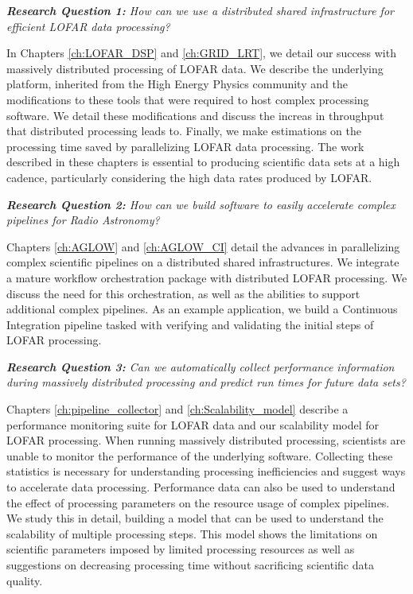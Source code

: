 \begin{addmargin}[4em]{8em}%
    \emph{\textbf{Research Question 1:} How can we use a distributed shared infrastructure for efficient LOFAR data processing?}
\end{addmargin}

In Chapters \ref{ch:LOFAR_DSP} and \ref{ch:GRID_LRT}, we detail our success with massively distributed processing of LOFAR data. We describe the underlying platform, inherited from the High Energy Physics community and the modifications to these tools that were required to host complex processing software. We detail these modifications and discuss the increas in throughput that distributed processing leads to. Finally, we make estimations on the processing time saved by parallelizing LOFAR data processing. The work described in these chapters is essential to producing scientific data sets at a high cadence, particularly considering the high data rates produced by LOFAR.  


\begin{addmargin}[4em]{8em}%
    \emph{\textbf{Research Question 2:} How can we build software to easily accelerate complex pipelines for Radio Astronomy?}
\end{addmargin}

Chapters \ref{ch:AGLOW} and \ref{ch:AGLOW_CI} detail the advances in parallelizing complex scientific pipelines on a distributed shared infrastructures. We integrate a mature workflow orchestration package with distributed LOFAR processing. We discuss the need for this orchestration, as well as the abilities to support additional complex pipelines. As an example application, we build a Continuous Integration pipeline tasked with verifying and validating the initial steps of LOFAR processing. 


\begin{addmargin}[4em]{8em}%
    \emph{\textbf{Research Question 3:} Can we automatically collect performance information during massively distributed processing and predict run times for future data sets?}
\end{addmargin}

Chapters \ref{ch:pipeline_collector} and \ref{ch:Scalability_model} describe a performance monitoring suite for LOFAR data and our scalability  model for LOFAR processing. When running massively distributed processing, scientists are unable to monitor the performance of the underlying software. Collecting these statistics is necessary for understanding processing inefficiencies and suggest ways to accelerate data processing. Performance data can also be used to understand the effect of processing parameters on the resource usage of complex pipelines. We study this in detail, building a model that can be used to understand the scalability of multiple processing steps. This model shows the limitations on scientific parameters imposed by limited processing resources as well as suggestions on decreasing processing time without sacrificing scientific data quality. 


